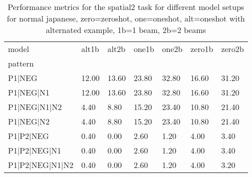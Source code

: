 \begin{table}[h]
\begin{tabular}{l|llllll}
\toprule
model & alt1b & alt2b & one1b & one2b & zero1b & zero2b \\
pattern &  &  &  &  &  &  \\
\midrule
P1|NEG & 12.00 & 13.60 & 23.80 & 32.80 & 16.60 & 31.20 \\
P1|NEG|N1 & 12.00 & 13.60 & 23.80 & 32.80 & 16.60 & 31.20 \\
P1|NEG|N1|N2 & 4.40 & 8.80 & 15.20 & 23.40 & 10.80 & 21.40 \\
P1|NEG|N2 & 4.40 & 8.80 & 15.20 & 23.40 & 10.80 & 21.40 \\
P1|P2|NEG & 0.40 & 0.00 & 2.60 & 1.20 & 4.00 & 3.40 \\
P1|P2|NEG|N1 & 0.40 & 0.00 & 2.60 & 1.20 & 4.00 & 3.40 \\
P1|P2|NEG|N1|N2 & 0.40 & 0.00 & 2.60 & 1.20 & 4.00 & 3.20 \\
\bottomrule
\end{tabular}
\caption{Performance metrics for the spatial2 task for different model setups for normal japanese, zero=zeroshot, one=oneshot, alt=oneshot with alternated example, 1b=1 beam, 2b=2 beams}
\label{tab:ja norm_spatial2_performance}
\end{table}
